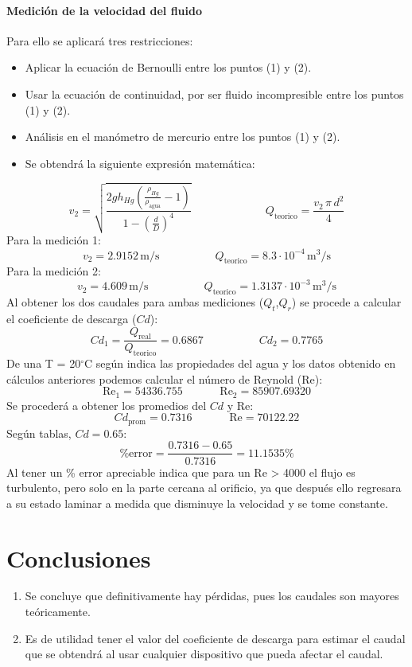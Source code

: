 \documentclass[a4paper,12pt]{report}
\begin{document}
\subsubsection{Medición de la velocidad del fluido}
Para ello se aplicará tres restricciones:
\begin{itemize}
\item Aplicar la ecuación de Bernoulli entre los puntos (1) y (2).
\item Usar la ecuación de continuidad, por ser fluido incompresible entre los puntos (1) y (2). 
\item Análisis en el manómetro de mercurio entre los puntos (1) y (2).
\item Se obtendrá la siguiente expresión matemática:
\end{itemize}
$$
v_{2} = \sqrt{\frac{2gh_{Hg}\left(\frac{\rho_{Hg}}{\rho_{\mathrm{agua}}}-1\right)}{1-\left(\frac{d}{D}\right)^{4}}} \hspace{80pt} Q_{\mathrm{teorico}} = \frac{v_{2}\,\pi\,d^{2}}{4}
$$
Para la medición 1:
$$
v_{2} = 2.9152\,\mathrm{m/s} \hspace{60pt} Q_{\mathrm{teorico}} = 8.3\cdot 10^{-4}\,\mathrm{m^{3}/s}
$$
Para la medición 2:
$$
v_{2} = 4.609\,\mathrm{m/s} \hspace{60pt} Q_{\mathrm{teorico}} = 1.3137\cdot 10^{-3}\,\mathrm{m^{3}/s}
$$
Al obtener los dos caudales para ambas mediciones ($Q_{t}$,$Q_{r}$) se procede a calcular el coeficiente de descarga ($Cd$):
$$
Cd_{1} = \frac{Q_{\mathrm{real}}}{Q_{\mathrm{teorico}}} = 0.6867 \hspace{60pt} Cd_{2} = 0.7765
$$
De una T = 20$^{\circ}$C según indica las propiedades del agua y los datos obtenido en cálculos anteriores podemos calcular el  número de Reynold (Re):
$$
\mathrm{Re}_{1} = 54336.755 \hspace{40pt} \mathrm{Re}_{2} = 85907.69320
$$
Se procederá a obtener los promedios del $Cd$ y Re:
$$
Cd_{\mathrm{prom}} = 0.7316 \hspace{40pt} \mathrm{Re} = 70122.22
$$
Según tablas, $Cd = 0.65$:
$$
\%\mathrm{error} = \frac{0.7316-0.65}{0.7316} = 11.1535\%
$$
Al tener un \% error apreciable indica que para un Re > 4000 el flujo es turbulento, pero solo en la parte cercana al orificio, ya que después ello regresara a su estado laminar a medida que disminuye la velocidad y se tome constante.
\chapter{Conclusiones}
\begin{enumerate}
\item Se concluye que definitivamente hay pérdidas, pues los caudales son mayores teóricamente.
\item Es de utilidad tener el valor del coeficiente de descarga para estimar el caudal que se obtendrá al usar cualquier dispositivo que pueda afectar el caudal.
\end{enumerate}
\end{document}
